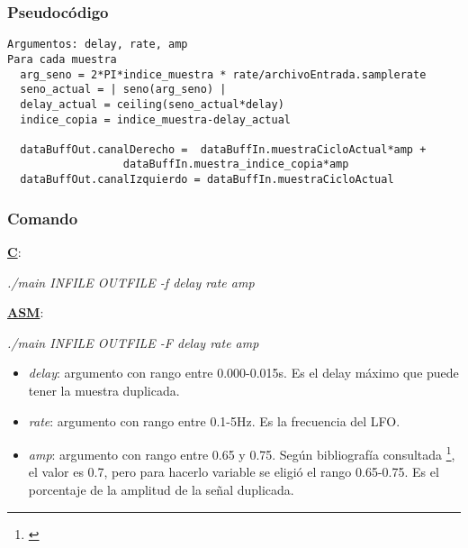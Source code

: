 \subsubsection{Pseudocódigo}
\label{subsec:desarrollo-flanger-code}

\lstset{language=C}
\begin{lstlisting}[frame=single]
Argumentos: delay, rate, amp
Para cada muestra
  arg_seno = 2*PI*indice_muestra * rate/archivoEntrada.samplerate
  seno_actual = | seno(arg_seno) |
  delay_actual = ceiling(seno_actual*delay)
  indice_copia = indice_muestra-delay_actual
  
  dataBuffOut.canalDerecho =  dataBuffIn.muestraCicloActual*amp + 
			      dataBuffIn.muestra_indice_copia*amp
  dataBuffOut.canalIzquierdo = dataBuffIn.muestraCicloActual
\end{lstlisting}

\subsubsection{Comando}
\label{subsec:desarrollo-flanger-call}

\underline{\textbf{C}}:
\begin{center}
 \textit{./main INFILE OUTFILE -f delay rate amp}
\end{center}

\underline{\textbf{ASM}}:
\begin{center}
 \textit{./main INFILE OUTFILE -F delay rate amp}
\end{center}

\begin{itemize}
 \item \textit{delay}: argumento con rango entre 0.000-0.015s. Es el delay máximo que puede tener la muestra duplicada.
 \item \textit{rate}: argumento con rango entre 0.1-5Hz. Es la frecuencia del LFO.
 \item \textit{amp}: argumento con rango entre 0.65 y 0.75. Según bibliografía consultada \footnote{\cite[p.~77]{zolzer11}}, el valor es 0.7, pero para hacerlo variable se eligió el rango 0.65-0.75. Es el porcentaje de la amplitud de la señal duplicada.
\end{itemize}